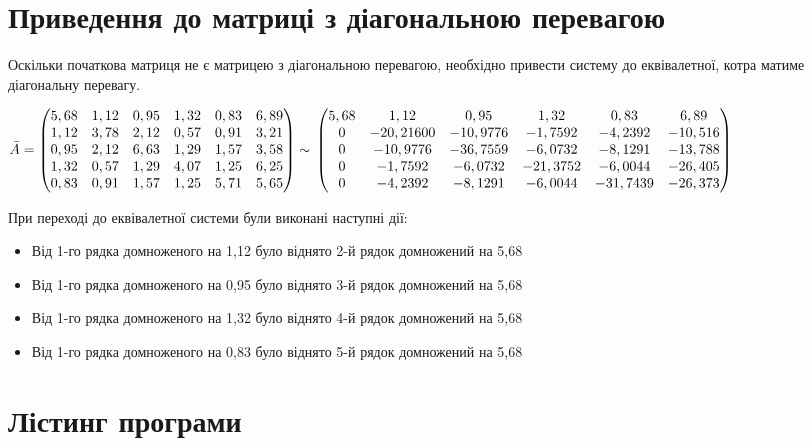 \documentclass{report}
\begin{document}
\section*{Приведення до матриці з діагональною перевагою}
Оскільки початкова матриця не є матрицею з діагональною перевагою, необхідно привести систему до еквівалетної, котра матиме діагональну перевагу.\par
$ \bar{A} = \begin{pmatrix}
	5,68 & 1,12 & 0,95 & 1,32 & 0,83 & 6,89\\
	1,12 & 3,78 & 2,12 & 0,57 & 0,91 & 3,21\\
	0,95 & 2,12 & 6,63 & 1,29 & 1,57 & 3,58\\
	1,32 & 0,57 & 1,29 & 4,07 & 1,25 & 6,25\\
	0,83 & 0,91 & 1,57 & 1,25 & 5,71 & 5,65
	\end{pmatrix} \sim \\
	\begin{pmatrix}
	5,68 & 1,12 & 0,95 & 1,32 & 0,83 & 6,89\\
	0 & -20,21600 & -10,9776 & -1,7592 & -4,2392 & -10,516\\
	0 & -10,9776 & -36,7559 & -6,0732 & -8,1291 & -13,788\\
	0 & -1,7592 & -6,0732 & -21,3752 & -6,0044 & -26,405\\
	0 & -4,2392 & -8,1291 & -6,0044 & -31,7439 & -26,373
	\end{pmatrix}\\
$\par
При переході до еквівалетної системи були виконані наступні дії:
\begin{itemize}
  \item Від 1-го рядка домноженого на 1,12 було віднято 2-й рядок домножений на 5,68
  \item Від 1-го рядка домноженого на 0,95 було віднято 3-й рядок домножений на 5,68
  \item Від 1-го рядка домноженого на 1,32 було віднято 4-й рядок домножений на 5,68
  \item Від 1-го рядка домноженого на 0,83 було віднято 5-й рядок домножений на 5,68
\end{itemize}

\section*{Лістинг програми}

\end{document}
